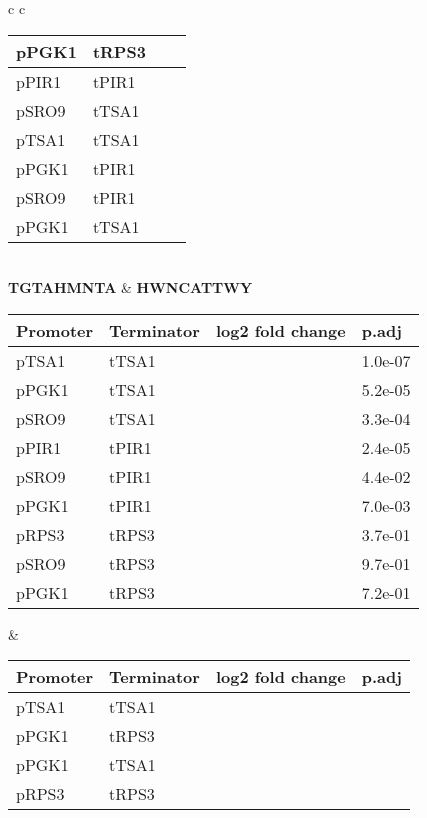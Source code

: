 \documentclass[../main.tex]{subfiles}
\begin{document}
\begin{table}
{\begin{tabular}{ c c }
\begin{tabularx}{0.45\textwidth} { 
  | >{\centering\arraybackslash}X 
  | >{\centering\arraybackslash}X  
  | >{\centering\arraybackslash}X
  | >{\centering\arraybackslash}X | }
\hline
pPGK1 & tRPS3 & -0.1268519 & 0.3900\\
\hline
pPIR1 & tPIR1 & -0.0872287 & 0.2800\\
\hline
pSRO9 & tTSA1 & -0.0170833 & 0.9100\\
\hline
pTSA1 & tTSA1 & 0.0669444 & 0.6700\\
\hline
pPGK1 & tPIR1 & 0.0843282 & 0.1900\\
\hline
pSRO9 & tPIR1 & 0.1539836 & 0.0760\\
\hline
pPGK1 & tTSA1 & 0.3288889 & 0.0200\\
\hline
\end{tabularx}
\\\textbf{TGTAHMNTA} & \textbf{HWNCATTWY} \\
\begin{tabularx}{0.45\textwidth} { 
  | >{\centering\arraybackslash}X 
  | >{\centering\arraybackslash}X  
  | >{\centering\arraybackslash}X
  | >{\centering\arraybackslash}X | }
\hline
\textbf{Promoter} & \textbf{Terminator} & \textbf{log2 fold change} & \textbf{p.adj}\\
\hline
pTSA1 & tTSA1 & -1.2986111 & 1.0e-07\\
\hline
pPGK1 & tTSA1 & -0.8977778 & 5.2e-05\\
\hline
pSRO9 & tTSA1 & -0.7969444 & 3.3e-04\\
\hline
pPIR1 & tPIR1 & -0.7679716 & 2.4e-05\\
\hline
pSRO9 & tPIR1 & -0.3607687 & 4.4e-02\\
\hline
pPGK1 & tPIR1 & -0.3570995 & 7.0e-03\\
\hline
pRPS3 & tRPS3 & -0.1788889 & 3.7e-01\\
\hline
pSRO9 & tRPS3 & -0.0075926 & 9.7e-01\\
\hline
pPGK1 & tRPS3 & 0.0798148 & 7.2e-01\\
\hline
\end{tabularx}
&
\begin{tabularx}{0.45\textwidth} { 
  | >{\centering\arraybackslash}X 
  | >{\centering\arraybackslash}X  
  | >{\centering\arraybackslash}X
  | >{\centering\arraybackslash}X | }
\hline
\textbf{Promoter} & \textbf{Terminator} & \textbf{log2 fold change} & \textbf{p.adj}\\
\hline
pTSA1 & tTSA1 & -0.3393056 & 0.0013\\
\hline
pPGK1 & tRPS3 & -0.2947222 & 0.0069\\
\hline
pPGK1 & tTSA1 & -0.2619444 & 0.0100\\
\hline
pRPS3 & tRPS3 & -0.2331481 & 0.0200\\

\end{tabularx}
\end{tabular}}
\end{table}
\end{document}
